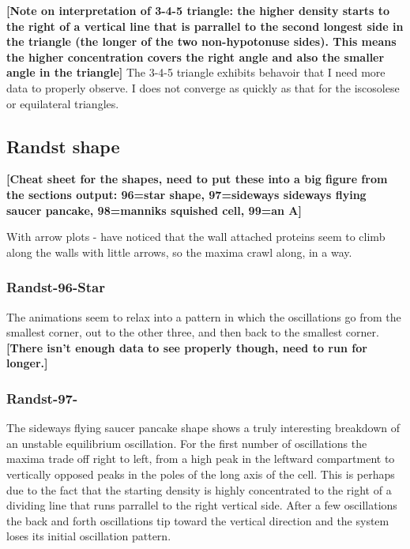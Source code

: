 \documentclass[letterpaper,twocolumn,amsmath,amssymb,pre]{revtex4-1}
\newcommand{\red}[1]{{\bf \color{red} #1}}
\newcommand{\fixme}[1]{\red{[#1]}}
\begin{document}
\fixme{Note on interpretation of 3-4-5 triangle: the higher density
  starts to the right of a vertical line that is parrallel to the
  second longest side in the triangle (the longer of the two
  non-hypotonuse sides).  This means the higher concentration covers
  the right angle and also the smaller angle in the triangle} The
3-4-5 triangle exhibits behavoir that I need more data to properly
observe.  I does not converge as quickly as that for the iscosolese or
equilateral triangles.

\subsection{Randst shape}
\fixme{Cheat sheet for the shapes, need to put these into a big figure
  from the sections output: 96=star shape, 97=sideways sideways
  flying saucer pancake, 98=manniks squished cell, 99=an A}

With arrow plots - have noticed that the wall attached proteins seem
to climb along the walls with little arrows, so the maxima crawl
along, in a way.

\begin{figure}

\end{figure}
\subsubsection{Randst-96-Star}
The animations seem to relax into a pattern in which the oscillations
go from the smallest corner, out to the other three, and then back to
the smallest corner.  \fixme{There isn't enough data to see properly
  though, need to run for longer.}

\subsubsection{Randst-97-}
The sideways flying saucer pancake shape shows a truly interesting
breakdown of an unstable equilibrium oscillation.  For the first
number of oscillations the maxima trade off right to left, from a high
peak in the leftward compartment to vertically opposed peaks in the
poles of the long axis of the cell.  This is perhaps due to the fact
that the starting density is highly concentrated to the right of a
dividing line that runs parrallel to the right vertical side.  After a
few oscillations the back and forth oscillations tip toward the
vertical direction and the system loses its initial oscillation
pattern.
\end{document}

